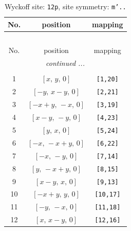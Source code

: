 \documentclass[fleqn,8pt]{jsarticle}
\begin{document}
\begin{longtable}{ccc}
\caption{Wyckoff site: {\tt 12p}, site symmetry: {\tt m'..}}
 \\
 \hline \hline
No. & position & mapping \\ \hline \endfirsthead

\multicolumn{2}{l}{\tablename\ \thetable{}} \\
 \hline \hline
No. & position & mapping \\ \hline \endhead

 \hline \hline
\multicolumn{2}{r}{\footnotesize\it continued ...} \\ \endfoot

 \hline \hline
\multicolumn{2}{r}{} \\ \endlastfoot

1 & $\left[ x,\, y,\, 0 \right]$ & {\tt [1,20]} \\ \hline
2 & $\left[ - y,\, x - y,\, 0 \right]$ & {\tt [2,21]} \\ \hline
3 & $\left[ - x + y,\, - x,\, 0 \right]$ & {\tt [3,19]} \\ \hline
4 & $\left[ x - y,\, - y,\, 0 \right]$ & {\tt [4,23]} \\ \hline
5 & $\left[ y,\, x,\, 0 \right]$ & {\tt [5,24]} \\ \hline
6 & $\left[ - x,\, - x + y,\, 0 \right]$ & {\tt [6,22]} \\ \hline
7 & $\left[ - x,\, - y,\, 0 \right]$ & {\tt [7,14]} \\ \hline
8 & $\left[ y,\, - x + y,\, 0 \right]$ & {\tt [8,15]} \\ \hline
9 & $\left[ x - y,\, x,\, 0 \right]$ & {\tt [9,13]} \\ \hline
10 & $\left[ - x + y,\, y,\, 0 \right]$ & {\tt [10,17]} \\ \hline
11 & $\left[ - y,\, - x,\, 0 \right]$ & {\tt [11,18]} \\ \hline
12 & $\left[ x,\, x - y,\, 0 \right]$ & {\tt [12,16]} \\
\end{longtable}
\renewcommand{\arraystretch}{1.2}
\end{document}
